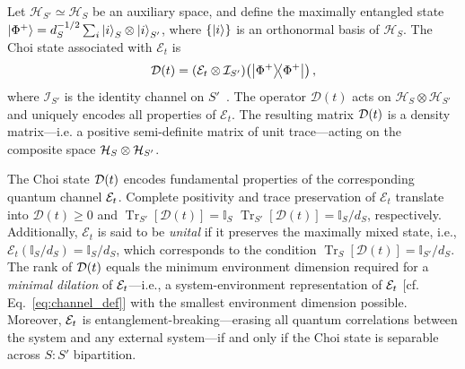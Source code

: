 \documentclass[pra,twocolumn,aps,showpacs,superscriptaddress,longbibliography]{revtex4-2}%
\providecommand{\DIFadd}[1]{{\protect\color{blue} \sf #1}} %
\providecommand{\DIFdel}[1]{{\protect\color{red} \scriptsize #1}} %
\providecommand{\DIFaddbegin}{} %
\providecommand{\DIFaddend}{} %
\providecommand{\DIFdelbegin}{} %
\providecommand{\DIFdelend}{} %
\begin{document}
Let $\mathcal{H}_{S'}\simeq\mathcal{H}_S$ be an auxiliary space, and define the maximally entangled state $\ket{\Phi^+}=d_S^{-1/2}\sum_i \ket{i}_S\otimes\ket{i}_{S'}$, where $\{\ket{i}\}$ is an orthonormal basis of $\mathcal{H}_S$. The Choi state associated with $\mathcal{E}_t$ is
\begin{equation}\label{eq:choi_def}
\mathcal{D}(t)=(\mathcal{E}_t\otimes\mathcal{I}_{S'})\!\left(\dyad{\Phi^+}\right),
\end{equation}
where $\mathcal{I}_{S'}$ is the identity channel on $S'$~\cite{bengtsson_2006_geometry}. The operator $\mathcal{D}(t)$ acts on $\mathcal{H}_S\otimes\mathcal{H}_{S'}$ and uniquely encodes all properties of $\mathcal{E}_t$. The resulting matrix $\mathcal{D}(t)$ is a density matrix---i.e. a positive semi-definite matrix of unit trace---acting on the composite space $\mathcal{H}_S \otimes \mathcal{H}_{S'}$.

The Choi state $\mathcal{D}(t)$ encodes fundamental properties of the corresponding quantum channel $\mathcal{E}_t$. 
Complete positivity and trace preservation of $\mathcal{E}_t$ translate into $\mathcal{D}(t)\ge0$ and \DIFdelbegin \DIFdel{$\operatorname{Tr}_{S'}[\mathcal{D}(t)]=\mathbb{I}_S$}\DIFdelend \DIFaddbegin \DIFadd{$\operatorname{Tr}_{S'}[\mathcal{D}(t)]=\mathbb{I}_S/d_S$}\DIFaddend , respectively. 
\DIFaddbegin \DIFadd{Additionally, $\mathcal{E}_t$ is said to be }\textit{\DIFadd{unital}} \DIFadd{if it preserves the maximally mixed state, i.e., $\mathcal{E}_t(\mathbb{I}_S/d_S) = \mathbb{I}_S/d_S$, which corresponds to the condition $\operatorname{Tr}_{S}[\mathcal{D}(t)] = \mathbb{I}_{S'}/d_{S}$.
}\DIFaddend The rank of $\mathcal{D}(t)$ equals the minimum environment dimension required for a \textit{minimal dilation} of $\mathcal{E}_t$---i.e., a system-environment representation of $\mathcal{E}_t$  [cf. Eq.~\eqref{eq:channel_def}] with the smallest environment dimension possible. Moreover, $\mathcal{E}_t$ is entanglement-breaking---erasing all quantum correlations between the system and any external system---if and only if the Choi state is separable across $S{:}S'$ bipartition.

\end{document}
